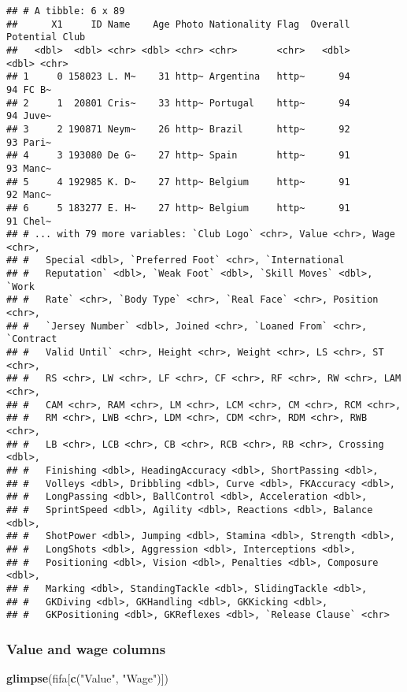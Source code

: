 \documentclass[]{article}
\newenvironment{Shaded}{\begin{snugshade}}{\end{snugshade}}
\newcommand{\KeywordTok}[1]{\textcolor[rgb]{0.13,0.29,0.53}{\textbf{#1}}}
\newcommand{\NormalTok}[1]{#1}
\newcommand{\StringTok}[1]{\textcolor[rgb]{0.31,0.60,0.02}{#1}}
\begin{document}
\begin{verbatim}
## # A tibble: 6 x 89
##      X1     ID Name    Age Photo Nationality Flag  Overall Potential Club 
##   <dbl>  <dbl> <chr> <dbl> <chr> <chr>       <chr>   <dbl>     <dbl> <chr>
## 1     0 158023 L. M~    31 http~ Argentina   http~      94        94 FC B~
## 2     1  20801 Cris~    33 http~ Portugal    http~      94        94 Juve~
## 3     2 190871 Neym~    26 http~ Brazil      http~      92        93 Pari~
## 4     3 193080 De G~    27 http~ Spain       http~      91        93 Manc~
## 5     4 192985 K. D~    27 http~ Belgium     http~      91        92 Manc~
## 6     5 183277 E. H~    27 http~ Belgium     http~      91        91 Chel~
## # ... with 79 more variables: `Club Logo` <chr>, Value <chr>, Wage <chr>,
## #   Special <dbl>, `Preferred Foot` <chr>, `International
## #   Reputation` <dbl>, `Weak Foot` <dbl>, `Skill Moves` <dbl>, `Work
## #   Rate` <chr>, `Body Type` <chr>, `Real Face` <chr>, Position <chr>,
## #   `Jersey Number` <dbl>, Joined <chr>, `Loaned From` <chr>, `Contract
## #   Valid Until` <chr>, Height <chr>, Weight <chr>, LS <chr>, ST <chr>,
## #   RS <chr>, LW <chr>, LF <chr>, CF <chr>, RF <chr>, RW <chr>, LAM <chr>,
## #   CAM <chr>, RAM <chr>, LM <chr>, LCM <chr>, CM <chr>, RCM <chr>,
## #   RM <chr>, LWB <chr>, LDM <chr>, CDM <chr>, RDM <chr>, RWB <chr>,
## #   LB <chr>, LCB <chr>, CB <chr>, RCB <chr>, RB <chr>, Crossing <dbl>,
## #   Finishing <dbl>, HeadingAccuracy <dbl>, ShortPassing <dbl>,
## #   Volleys <dbl>, Dribbling <dbl>, Curve <dbl>, FKAccuracy <dbl>,
## #   LongPassing <dbl>, BallControl <dbl>, Acceleration <dbl>,
## #   SprintSpeed <dbl>, Agility <dbl>, Reactions <dbl>, Balance <dbl>,
## #   ShotPower <dbl>, Jumping <dbl>, Stamina <dbl>, Strength <dbl>,
## #   LongShots <dbl>, Aggression <dbl>, Interceptions <dbl>,
## #   Positioning <dbl>, Vision <dbl>, Penalties <dbl>, Composure <dbl>,
## #   Marking <dbl>, StandingTackle <dbl>, SlidingTackle <dbl>,
## #   GKDiving <dbl>, GKHandling <dbl>, GKKicking <dbl>,
## #   GKPositioning <dbl>, GKReflexes <dbl>, `Release Clause` <chr>
\end{verbatim}

\hypertarget{value-and-wage-columns}{%
\subsubsection{Value and wage columns}\label{value-and-wage-columns}}

\begin{Shaded}
\begin{Highlighting}[]
\KeywordTok{glimpse}\NormalTok{(fifa[}\KeywordTok{c}\NormalTok{(}\StringTok{"Value"}\NormalTok{, }\StringTok{"Wage"}\NormalTok{)])}
\end{Highlighting}
\end{Shaded}
\end{document}
